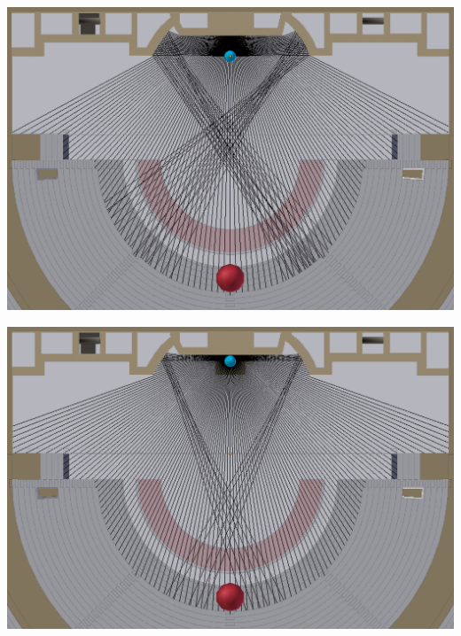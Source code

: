 \begin{figureth}
\begin{subfigureth}{0.48\textwidth}
		\includegraphics[width=\linewidth]{images/test_source3}
		\caption{Réflexions des rayons sur le mur de scène pour une source située en [0 ; 14,5 ; 42,8].}
		\label{test_source3}
	\end{subfigureth}
	\quad
	\begin{subfigureth}{0.48\textwidth}
		\includegraphics[width=\linewidth]{images/test_source4}
		\caption{Réflexions des rayons sur le mur de scène pour une source située en [0 ; 16,5 ; 42,8].}
		\label{test_source4}
	\end{subfigureth}
\caption{Réflexions des rayons propagés depuis une source vers le mur de scène dans un plan horizontal.}	
\label{test_source}
\end{figureth}	

